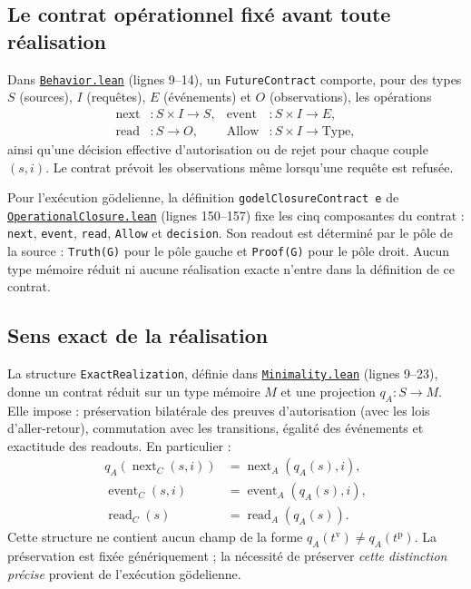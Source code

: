 \documentclass[11pt,a4paper]{article}
\newcommand{\code}[1]{\nolinkurl{#1}}
\newcommand{\SourceAt}[3]{\href{https://github.com/JohnDoe-collab-stack/relational-perimeter/blob/1e5aeda745559d62a3819bb3213da7fce3c31ad1/#1\#L#2}{\nolinkurl{#3}}}
\theoremstyle{remark}
\begin{document}
\subsection{Le contrat opérationnel fixé avant toute réalisation}

Dans \SourceAt{RelationalPerimeter/Constitution/Continuation/Behavior.lean}{9-L14}{Behavior.lean}
(lignes 9--14), un \code{FutureContract} comporte, pour des types
$S$ (sources), $I$ (requêtes), $E$ (événements) et $O$ (observations),
les opérations
\[
\begin{aligned}
\operatorname{next}&:S\times I\to S, &
\operatorname{event}&:S\times I\to E,\\
\operatorname{read}&:S\to O, &
\operatorname{Allow}&:S\times I\to\mathrm{Type},
\end{aligned}
\]
ainsi qu'une décision effective d'autorisation ou de rejet pour chaque
couple $(s,i)$. Le contrat prévoit les observations même lorsqu'une requête
est refusée.

Pour l'exécution gödelienne, la définition
\code{godelClosureContract e} de
\SourceAt{RelationalPerimeter/Constitution/Godel/OperationalClosure.lean}{150-L157}{OperationalClosure.lean}
(lignes 150--157) fixe les cinq composantes du contrat : \code{next},
\code{event}, \code{read}, \code{Allow} et \code{decision}. Son
readout est déterminé par le pôle de la source :
\code{Truth(G)} pour le pôle gauche et \code{Proof(G)} pour le pôle droit.
Aucun type mémoire réduit ni aucune réalisation exacte n'entre dans
la définition de ce contrat.

\subsection{Sens exact de la réalisation}

La structure \code{ExactRealization}, définie dans
\SourceAt{RelationalPerimeter/Constitution/Continuation/Minimality.lean}{9-L23}{Minimality.lean}
(lignes 9--23), donne un contrat réduit sur un type mémoire $M$ et une
projection $q_A:S\to M$. Elle impose : préservation bilatérale des
preuves d'autorisation (avec les lois d'aller-retour), commutation avec
les transitions, égalité des événements et exactitude des readouts.
En particulier :
\begin{equation}\label{eq:exactness}
\begin{aligned}
q_A(\operatorname{next}_C(s,i))
  &=\operatorname{next}_{A}(q_A(s),i),\\
\operatorname{event}_C(s,i)
  &=\operatorname{event}_{A}(q_A(s),i),\\
\operatorname{read}_C(s)
  &=\operatorname{read}_{A}(q_A(s)).
\end{aligned}
\end{equation}
Cette structure ne contient aucun champ de la forme
$q_A(t^{\mathrm v})\neq q_A(t^{\mathrm p})$. La préservation est fixée
génériquement ; la nécessité de préserver \emph{cette distinction précise}
provient de l'exécution gödelienne.
\end{document}
